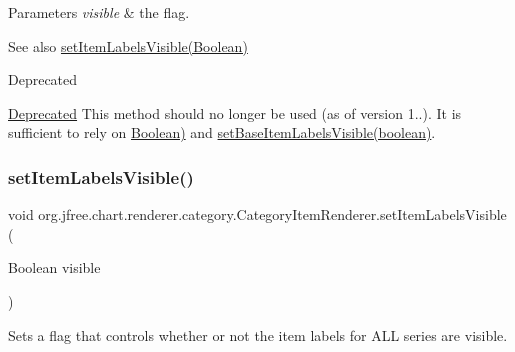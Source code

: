 \begin{DoxyParams}{Parameters}
{\em visible} & the flag.\\
\hline
\end{DoxyParams}
\begin{DoxySeeAlso}{See also}
\mbox{\hyperlink{interfaceorg_1_1jfree_1_1chart_1_1renderer_1_1category_1_1_category_item_renderer_ae8cdb257a01b5dc8cd2dffc97b5564fc}{set\+Item\+Labels\+Visible(\+Boolean)}}
\end{DoxySeeAlso}
\begin{DoxyRefDesc}{Deprecated}
\item[\mbox{\hyperlink{deprecated__deprecated000164}{Deprecated}}]This method should no longer be used (as of version 1..). It is sufficient to rely on \mbox{\hyperlink{}{Boolean)}} and \mbox{\hyperlink{interfaceorg_1_1jfree_1_1chart_1_1renderer_1_1category_1_1_category_item_renderer_ac6695ccdc953127606d151a4b17f70a7}{set\+Base\+Item\+Labels\+Visible(boolean)}}. \end{DoxyRefDesc}
\mbox{\label{interfaceorg_1_1jfree_1_1chart_1_1renderer_1_1category_1_1_category_item_renderer_ae8cdb257a01b5dc8cd2dffc97b5564fc}} 
\subsubsection{\texorpdfstring{set\+Item\+Labels\+Visible()}{setItemLabelsVisible()}\hspace{0.1cm}{\footnotesize\ttfamily [2/3]}}
{\footnotesize\ttfamily void org.\+jfree.\+chart.\+renderer.\+category.\+Category\+Item\+Renderer.\+set\+Item\+Labels\+Visible (\begin{DoxyParamCaption}\item[{Boolean}]{visible }\end{DoxyParamCaption})}

Sets a flag that controls whether or not the item labels for A\+LL series are visible.


